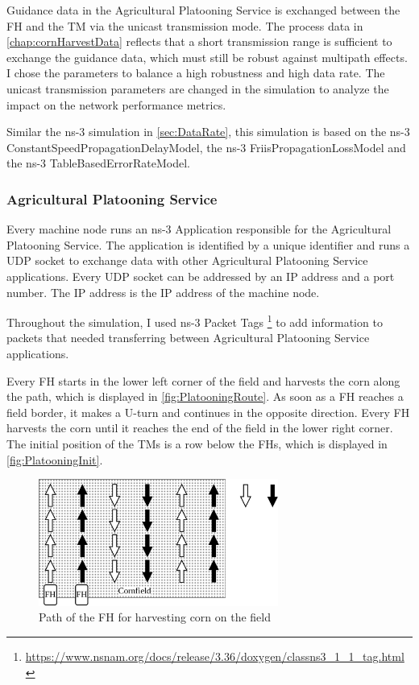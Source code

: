 Guidance data in the Agricultural Platooning Service is exchanged between the \ac{FH} and the \ac{TM} via the
unicast transmission mode.
The process data in \autoref{chap:cornHarvestData} reflects that a short transmission range
is sufficient to exchange the guidance data, which must still be robust against multipath effects.
I chose the parameters to balance a high robustness and high data rate.
The unicast transmission parameters are changed in the simulation to analyze the impact on the network performance metrics.

Similar the ns-3 simulation in \autoref{sec:DataRate}, this simulation is based on the ns-3 ConstantSpeedPropagationDelayModel, the ns-3 FriisPropagationLossModel and
the ns-3 TableBasedErrorRateModel.


\subsubsection*{Agricultural Platooning Service}
Every machine node runs an ns-3 Application responsible for the Agricultural Platooning Service.
The application is identified by a unique identifier and runs a \ac{UDP} socket to exchange data with other Agricultural Platooning Service applications.
Every \ac{UDP} socket can be addressed by an IP address and a port number.
The IP address is the IP address of the machine node.

Throughout the simulation, I used ns-3 Packet Tags \footnote{\url{https://www.nsnam.org/docs/release/3.36/doxygen/classns3_1_1_tag.html}} to add information to packets that needed transferring between Agricultural Platooning Service applications.

Every \ac{FH} starts in the lower left corner of the field and harvests the corn along the path,
which is displayed in \autoref{fig:PlatooningRoute}.
As soon as a \ac{FH} reaches a field border, it makes a U-turn and continues
in the opposite direction.
Every \ac{FH} harvests the corn until it reaches the end of the field in the lower right corner.
The initial position of the \ac{TM}s is a row below the \ac{FH}s, which is displayed in \autoref{fig:PlatooningInit}.
\begin{figure}[H]%
   \centering
   \includegraphics[width=0.7\textwidth]{figures/drawings-Route}
   \caption{Path of the \acf{FH} for harvesting corn on the field}
   \label{fig:PlatooningRoute}%
\end{figure}

